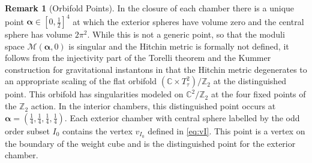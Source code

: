 \documentclass[12pt,letterpaper,reqno]{amsart}
\def\mathbf#1{#1}%
\theoremstyle{remark}
\theoremstyle{definition}
\newtheorem{rem}[thm]{Remark}
\numberwithin{thm}{section}
\numberwithin{equation}{section}
\numberwithin{figure}{section}
\newcommand{\C}{\ensuremath{\mathbb C}}
\newcommand{\Z}{\ensuremath{\mathbb Z}}
\begin{document}
  
  \begin{rem} [Orbifold Points] \label{rem:orbifold} In the closure of each chamber there is a unique point $\boldsymbol{\alpha} \in [0, \frac 12]^4$  at which the exterior spheres have volume zero and the central sphere has volume $2 \pi^2$. While this is not a generic point, so that the moduli space $\mathcal{M}(\boldsymbol{\alpha}, \mathbf{0})$ is singular and the Hitchin metric is formally not defined, it follows from the injectivity part of the Torelli theorem \cite{CVZ2024} and the Kummer construction for gravitational instantons in \cite{BM11} that the Hitchin metric degenerates to an appropriate scaling of the flat orbifold $(\C \times T^2_\tau)/\Z_2$ at the distinguished point. This orbifold has singularities modeled on $\C^2/\Z_2$ at the four fixed points of the $\Z_2$ action. In the interior chambers, this distinguished point occurs at $\boldsymbol{\alpha}=(\frac{1}{4}, \frac{1}{4}, \frac{1}{4},\frac{1}{4})$.
Each exterior chamber with central sphere labelled by the odd order subset $I_0$ contains the vertex $v_{I_0}$ defined in \eqref{eq:vI}. This point is a vertex on the boundary of the weight cube and is the distinguished point for the exterior chamber.
  \end{rem}
  
\end{document}
